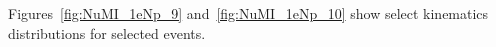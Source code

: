 Figures~\ref{fig:NuMI_1eNp_9} and~\ref{fig:NuMI_1eNp_10} show select kinematics distributions for selected \npsel events.

